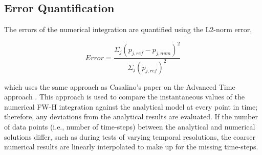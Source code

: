 \subsection{Error Quantification}\label{subsec:error_quantification1}
The errors of the numerical integration are quantified using the L2-norm error,

\begin{equation}
    Error = \frac{\Sigma_j(p_{j,ref} - p_{j,num})^2}{\Sigma_j(p_{j,ref})^2} 
    \label{eq:error}
\end{equation}

which uses the same approach as Casalino's paper on the Advanced Time approach \cite{casalino-2001}. This approach is used to compare the instantaneous values of the numerical FW-H integration against the analytical model at every point in time; therefore, any deviations from the analytical results are evaluated. If the number of data points (i.e., number of time-steps) between the analytical and numerical solutions differ, such as during tests of varying temporal resolutions, the coarser numerical results are linearly interpolated to make up for the missing time-steps.

\clearpage
